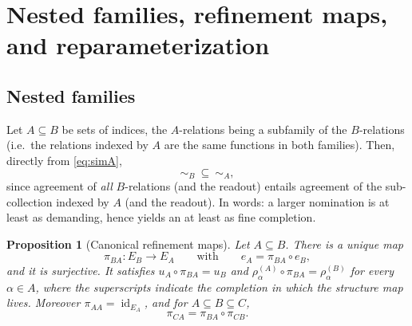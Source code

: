 \documentclass[11pt,reqno]{amsart}
\theoremstyle{plain}
\newtheorem{proposition}[theorem]{Proposition}
\theoremstyle{definition}
\theoremstyle{remark}
\numberwithin{equation}{section}
\DeclareMathOperator{\id}{id}
\begin{document}
\section{Nested families, refinement maps, and reparameterization}
\label{sec:refinement}

\subsection{Nested families}

Let $A\subseteq B$ be sets of indices, the $A$-relations being a subfamily of the $B$-relations
(i.e.\ the relations indexed by $A$ are the same functions in both families). Then, directly from
\eqref{eq:simA},
\begin{equation}
\label{eq:nested-order}
\sim_B\ \subseteq\ \sim_A ,
\end{equation}
since agreement of \emph{all} $B$-relations (and the readout) entails agreement of the sub-collection
indexed by $A$ (and the readout). In words: a larger nomination is at least as demanding, hence
yields an at least as fine completion.

\begin{proposition}[Canonical refinement maps]
\label{prop:refinement}
Let $A\subseteq B$. There is a unique map
\begin{equation}
\label{eq:piBA}
\pi_{BA}\colon E_B\longrightarrow E_A
\qquad\text{with}\qquad
e_A=\pi_{BA}\circ e_B ,
\end{equation}
and it is surjective. It satisfies $u_A\circ\pi_{BA}=u_B$ and
$\rho_\alpha^{(A)}\circ\pi_{BA}=\rho_\alpha^{(B)}$ for every $\alpha\in A$, where the superscripts
indicate the completion in which the structure map lives. Moreover $\pi_{AA}=\id_{E_A}$, and for
$A\subseteq B\subseteq C$,
\begin{equation}
\label{eq:cocycle}
\pi_{CA}=\pi_{BA}\circ\pi_{CB}.
\end{equation}
\end{proposition}
\end{document}
